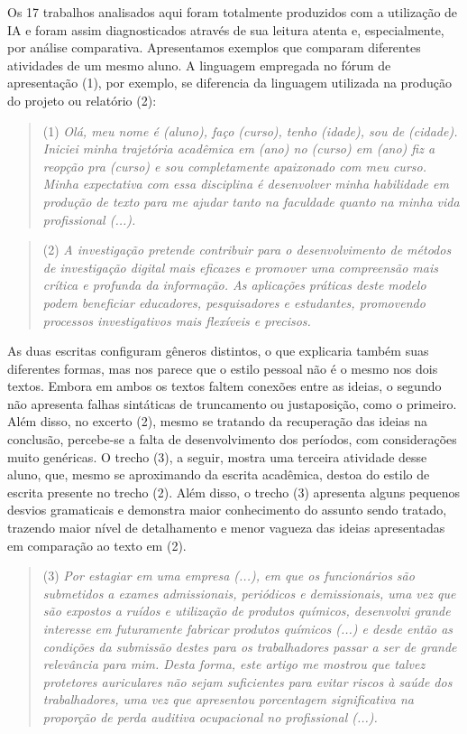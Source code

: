 \documentclass[portuguese]{textolivre}
\begin{document}
Os 17 trabalhos analisados aqui foram totalmente produzidos com a utilização de IA e foram assim diagnosticados através de sua leitura atenta e, especialmente, por análise comparativa. Apresentamos exemplos que comparam diferentes atividades de um mesmo aluno. A linguagem empregada no fórum de apresentação (1), por exemplo, se diferencia da linguagem utilizada na produção do projeto ou relatório (2):

\begin{quote}
    (1) \textit{Olá, meu nome é (aluno), faço (curso), tenho (idade), sou de (cidade). Iniciei minha trajetória acadêmica em (ano) no (curso) em (ano) fiz a reopção pra (curso) e sou completamente apaixonado com meu curso. Minha expectativa com essa disciplina é desenvolver minha habilidade em produção de texto para me ajudar tanto na faculdade quanto na minha vida profissional (...).}
\end{quote}

\begin{quote}
    (2) \textit{A investigação pretende contribuir para o desenvolvimento de métodos de investigação digital mais eficazes e promover uma compreensão mais crítica e profunda da informação. As aplicações práticas deste modelo podem beneficiar educadores, pesquisadores e estudantes, promovendo processos investigativos mais flexíveis e precisos.}
\end{quote}

As duas escritas configuram gêneros distintos, o que explicaria também suas diferentes formas, mas nos parece que o estilo pessoal não é o mesmo nos dois textos. Embora em ambos os textos faltem conexões entre as ideias, o segundo não apresenta falhas sintáticas de truncamento ou justaposição, como o primeiro. Além disso, no excerto (2), mesmo se tratando da recuperação das ideias na conclusão, percebe-se a falta de desenvolvimento dos períodos, com considerações muito genéricas. O trecho (3), a seguir, mostra uma terceira atividade desse aluno, que, mesmo se aproximando da escrita acadêmica, destoa do estilo de escrita presente no trecho (2). Além disso, o trecho (3) apresenta alguns pequenos desvios gramaticais e demonstra maior conhecimento do assunto sendo tratado, trazendo maior nível de detalhamento e menor vagueza das ideias apresentadas em comparação ao texto em (2).
\begin{quote}
    (3) \textit{Por estagiar em uma empresa (...), em que os funcionários são submetidos a exames admissionais, periódicos e demissionais, uma vez que são expostos a ruídos e utilização de produtos químicos, desenvolvi grande interesse em futuramente fabricar produtos químicos (...) e desde então as condições da submissão destes para os trabalhadores passar a ser de grande relevância para mim. Desta forma, este artigo me mostrou que talvez protetores auriculares não sejam suficientes para evitar riscos à saúde dos trabalhadores, uma vez que apresentou porcentagem significativa na proporção de perda auditiva ocupacional no profissional (...).}
\end{quote}
\end{document}
